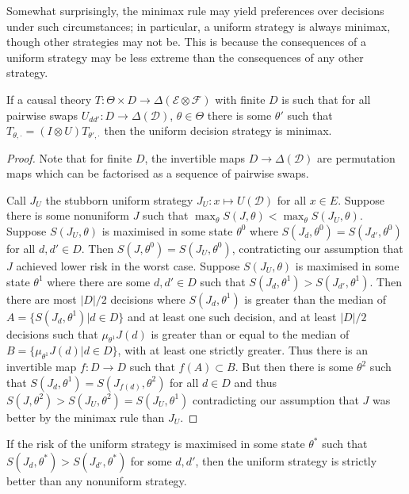 Somewhat surprisingly, the minimax rule may yield preferences over decisions under such circumstances; in particular, a uniform strategy is always minimax, though other strategies may not be. This is because the consequences of a uniform strategy may be less extreme than the consequences of any other strategy.

\begin{theorem}
If a causal theory $T:\Theta\times D\to \Delta(\mathcal{E}\otimes\mathcal{F})$ with finite $D$ is such that for all pairwise swaps $U_{dd'}:D\to \Delta(\mathcal{D})$, $\theta\in \Theta$ there is some $\theta'$ such that $T_{\theta,\cdot} = (I\otimes U)T_{\theta',\cdot}$ then the uniform decision strategy is minimax.
\end{theorem}

\begin{proof}
Note that for finite $D$, the invertible maps $D\to \Delta(\mathcal{D})$ are permutation maps which can be factorised as a sequence of pairwise swaps.

Call $J_U$ the stubborn uniform strategy $J_U:x\mapsto U(\mathcal{D})$ for all $x\in E$. Suppose there is some nonuniform $J$ such that $\max_\theta S(J,\theta) < \max_\theta S(J_U,\theta)$. Suppose $S(J_U,\theta)$ is maximised in some state $\theta^0$ where $S(J_d,\theta^0)=S(J_{d'},\theta^0)$ for all $d,d'\in D$. Then $S(J,\theta^0)=S(J_U,\theta^0)$, contraticting our assumption that $J$ achieved lower risk in the worst case. Suppose $S(J_U,\theta)$ is maximised in some state $\theta^1$ where there are some $d,d'\in D$ such that $S(J_d,\theta^1)>S(J_{d'},\theta^1)$. Then there are most $|D|/2$ decisions where $S(J_d,\theta^1)$ is greater than the median of $A=\{S(J_d,\theta^1)|d\in D\}$ and at least one such decision, and at least $|D|/2$ decisions such that $\mu_{\theta^1} J(d)$ is greater than or equal to the median of $B=\{\mu_{\theta^1} J(d)|d\in D\}$, with at least one strictly greater. Thus there is an invertible map $f:D\to D$ such that $f(A)\subset B$. But then there is some $\theta^2$ such that $S(J_d,\theta^1)=S(J_{f(d)},\theta^2)$ for all $d\in D$ and thus $S(J,\theta^2)> S(J_U,\theta^2) = S(J_U,\theta^1)$ contradicting our assumption that $J$ was better by the minimax rule than $J_U$.
\end{proof}

\begin{corollary}
If the risk of the uniform strategy is maximised in some state $\theta^*$ such that $S(J_d,\theta^*)>S(J_{d'},\theta^*)$ for some $d,d'$, then the uniform strategy is strictly better than any nonuniform strategy.
\end{corollary}

